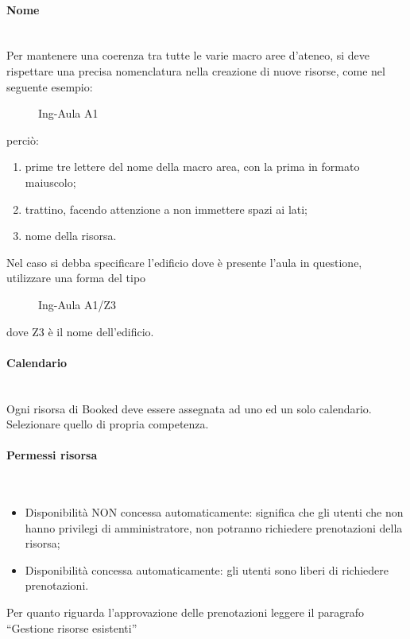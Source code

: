 \paragraph*{Nome}\mbox{}\\ %
Per mantenere una coerenza tra tutte le varie macro aree d'ateneo, si deve rispettare una precisa
nomenclatura nella creazione di nuove risorse, come nel seguente esempio:
\begin{figure}[H]
\centering{}Ing-Aula A1
\normalsize
\end{figure}
perciò:
\begin{enumerate}
 \item prime tre lettere del nome della macro area, con la prima in formato maiuscolo;
 \item trattino, facendo attenzione a non immettere spazi ai lati;
 \item nome della risorsa.
\end{enumerate}

Nel caso si debba specificare l'edificio dove è presente l'aula in questione, utilizzare
una forma del tipo
\begin{figure}[H]
\centering{}Ing-Aula A1/Z3
\normalsize
\end{figure}
dove Z3 è il nome dell'edificio.

\paragraph*{Calendario}\mbox{}\\ %
Ogni risorsa di Booked deve essere assegnata ad uno ed un solo calendario.
Selezionare quello di propria competenza.

\paragraph*{Permessi risorsa}\mbox{}\\ %
\begin{itemize}
 \item Disponibilità NON concessa automaticamente: significa che gli utenti che non hanno privilegi
 di amministratore, non potranno richiedere prenotazioni della risorsa;
 \item Disponibilità concessa automaticamente: gli utenti sono liberi di richiedere prenotazioni.
\end{itemize}
Per quanto riguarda l'approvazione delle prenotazioni leggere il paragrafo
``Gestione risorse esistenti''

